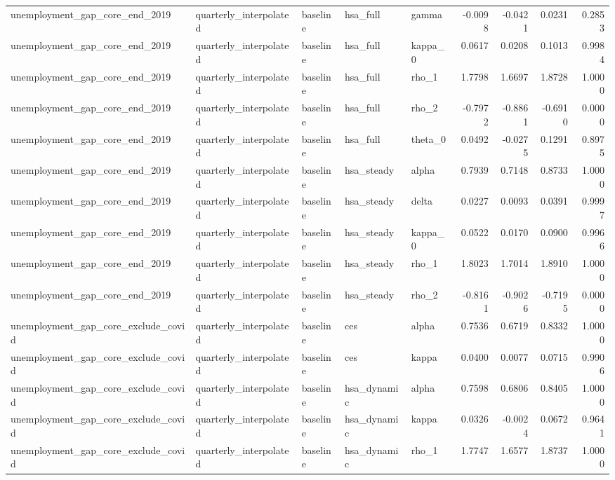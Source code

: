 \begin{tabular}{lllllrrrr}
unemployment\_gap\_core\_end\_2019 & quarterly\_interpolated & baseline & hsa\_full & gamma & -0.0098 & -0.0421 & 0.0231 & 0.2853 \\
unemployment\_gap\_core\_end\_2019 & quarterly\_interpolated & baseline & hsa\_full & kappa\_0 & 0.0617 & 0.0208 & 0.1013 & 0.9984 \\
unemployment\_gap\_core\_end\_2019 & quarterly\_interpolated & baseline & hsa\_full & rho\_1 & 1.7798 & 1.6697 & 1.8728 & 1.0000 \\
unemployment\_gap\_core\_end\_2019 & quarterly\_interpolated & baseline & hsa\_full & rho\_2 & -0.7972 & -0.8861 & -0.6910 & 0.0000 \\
unemployment\_gap\_core\_end\_2019 & quarterly\_interpolated & baseline & hsa\_full & theta\_0 & 0.0492 & -0.0275 & 0.1291 & 0.8975 \\
unemployment\_gap\_core\_end\_2019 & quarterly\_interpolated & baseline & hsa\_steady & alpha & 0.7939 & 0.7148 & 0.8733 & 1.0000 \\
unemployment\_gap\_core\_end\_2019 & quarterly\_interpolated & baseline & hsa\_steady & delta & 0.0227 & 0.0093 & 0.0391 & 0.9997 \\
unemployment\_gap\_core\_end\_2019 & quarterly\_interpolated & baseline & hsa\_steady & kappa\_0 & 0.0522 & 0.0170 & 0.0900 & 0.9966 \\
unemployment\_gap\_core\_end\_2019 & quarterly\_interpolated & baseline & hsa\_steady & rho\_1 & 1.8023 & 1.7014 & 1.8910 & 1.0000 \\
unemployment\_gap\_core\_end\_2019 & quarterly\_interpolated & baseline & hsa\_steady & rho\_2 & -0.8161 & -0.9026 & -0.7195 & 0.0000 \\
unemployment\_gap\_core\_exclude\_covid & quarterly\_interpolated & baseline & ces & alpha & 0.7536 & 0.6719 & 0.8332 & 1.0000 \\
unemployment\_gap\_core\_exclude\_covid & quarterly\_interpolated & baseline & ces & kappa & 0.0400 & 0.0077 & 0.0715 & 0.9906 \\
unemployment\_gap\_core\_exclude\_covid & quarterly\_interpolated & baseline & hsa\_dynamic & alpha & 0.7598 & 0.6806 & 0.8405 & 1.0000 \\
unemployment\_gap\_core\_exclude\_covid & quarterly\_interpolated & baseline & hsa\_dynamic & kappa & 0.0326 & -0.0024 & 0.0672 & 0.9641 \\
unemployment\_gap\_core\_exclude\_covid & quarterly\_interpolated & baseline & hsa\_dynamic & rho\_1 & 1.7747 & 1.6577 & 1.8737 & 1.0000 \\

\end{tabular}

